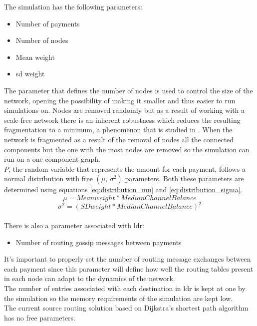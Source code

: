 The simulation has the following parameters:
\begin{itemize}
    \item Number of payments
    \item Number of nodes
    \item Mean weight
    \item \acrfull{sd} weight
\end{itemize}
The parameter that defines the number of nodes is used to control the size of the network, opening the possibility of making it smaller and thus easier to run simulations on. Nodes are removed randomly but as a result of working with a scale-free network there is an inherent robustness \cite{network_science} which reduces the resulting fragmentation to a minimum, a phenomenon that is studied in \cite{ln_topological}. When the network is fragmented as a result of the removal of nodes all the connected components but the one with the most nodes are removed so the simulation can run on a one component graph.\\
$P$, the random variable that represents the amount for each payment, follows a normal distribution with free $(\mu,\,\sigma^{2})$ parameters. Both these parameters are determined using equations \ref{eq:distribution_mu} and \ref{eq:distribution_sigma}. 
\begin{equation}
    \mu = Mean weight * Median Channel Balance
    \label{eq:distribution_mu}
\end{equation}
\begin{equation}
    \sigma^2 = (SD weight * Median Channel Balance)^2
    \label{eq:distribution_sigma}
\end{equation}
\\
There is also a parameter associated with \acrshort{ldr}:
\begin{itemize}
    \item Number of routing gossip messages between payments
\end{itemize}
It's important to properly set the number of routing message exchanges between each payment since this parameter will define how well the routing tables present in each node can adapt to the dynamics of the network.\\
The number of entries associated with each destination in \acrshort{ldr} is kept at one by the simulation so the memory requirements of the simulation are kept low.\\
The current source routing solution based on Dijkstra's shortest path algorithm has no free parameters.\\

